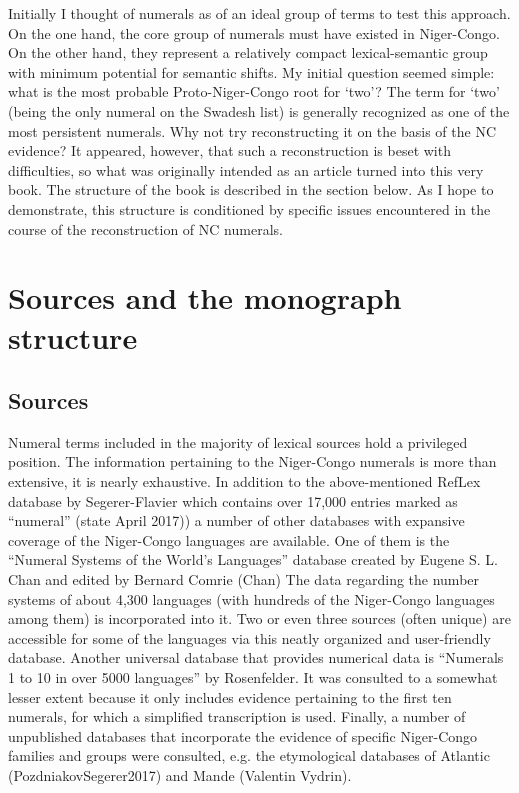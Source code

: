 Initially I thought of numerals as of an ideal group of terms to test this approach. On the one hand, the core group of numerals must have existed in Niger-Congo. On the other hand, they represent a relatively compact lexical-semantic group with minimum potential for semantic shifts. My initial question seemed simple: what is the most probable Proto-Niger-Congo root for ‘two’? The term for ‘two’ (being the only numeral on the Swadesh list) is generally recognized as one of the most persistent numerals. Why not try reconstructing it on the basis of the NC evidence? It appeared, however, that such a reconstruction is beset with difficulties, so what was originally intended as an article turned into this very book. The structure of the book is described in the section below. As I hope to demonstrate, this structure is conditioned by specific issues encountered in the course of the reconstruction of NC numerals. 

\section{Sources and the monograph structure}
\largerpage
\subsection{Sources}
Numeral terms included in the majority of lexical sources hold a privileged position. The information pertaining to the Niger-Congo numerals is more than extensive, it is nearly exhaustive. In addition to the above-mentioned RefLex database by Segerer-Flavier which contains over 17,000 entries marked as “numeral” (state  {April 2017)}) a number of other databases with expansive coverage of the Niger-Congo languages are available. One of them is the “Numeral Systems of the World's Languages” database created by Eugene S. L. Chan and edited by Bernard Comrie (Chan) The data regarding the number systems of about 4,300 languages (with hundreds of the Niger-Congo languages among them) is incorporated into it. Two or even three sources (often unique) are accessible for some of the languages via this neatly organized and user-friendly database. Another universal database that provides numerical data is “Numerals 1 to 10 in over 5000 languages” by Rosenfelder. It was consulted to a somewhat lesser extent because it only includes evidence pertaining to the first ten numerals, for which a simplified transcription is used. Finally, a number of unpublished databases that incorporate the evidence of specific Niger-Congo families and groups  were consulted, e.g. the etymological databases of Atlantic (PozdniakovSegerer2017) and Mande (Valentin Vydrin). 

